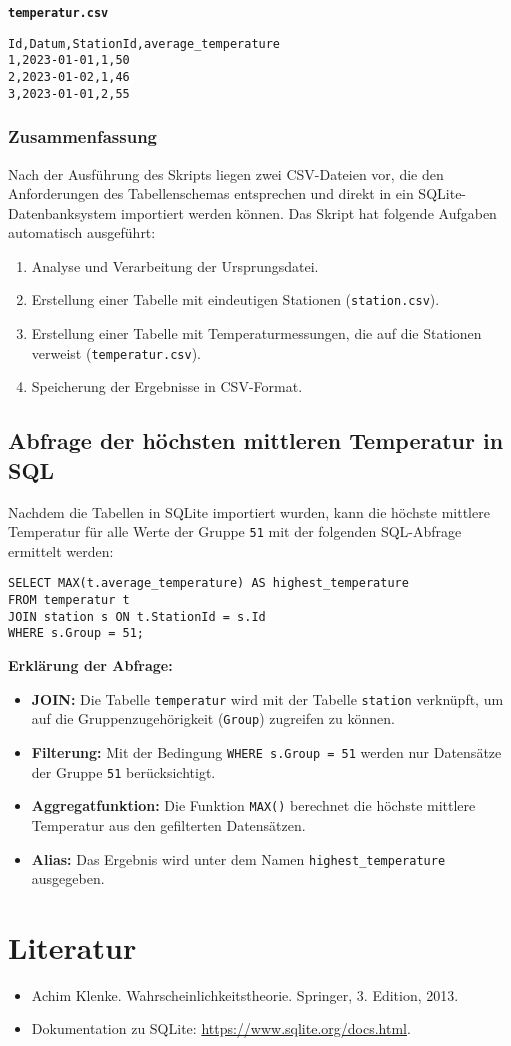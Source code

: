 \documentclass[a4paper,12pt]{article}
\begin{document}
\textbf{\texttt{temperatur.csv}}
\begin{verbatim}
Id,Datum,StationId,average_temperature
1,2023-01-01,1,50
2,2023-01-02,1,46
3,2023-01-01,2,55
\end{verbatim}

\subsubsection{Zusammenfassung}
Nach der Ausführung des Skripts liegen zwei CSV-Dateien vor, die den Anforderungen des Tabellenschemas entsprechen und direkt in ein SQLite-Datenbanksystem importiert werden können. Das Skript hat folgende Aufgaben automatisch ausgeführt:
\begin{enumerate}
    \item Analyse und Verarbeitung der Ursprungsdatei.
    \item Erstellung einer Tabelle mit eindeutigen Stationen (\texttt{station.csv}).
    \item Erstellung einer Tabelle mit Temperaturmessungen, die auf die Stationen verweist (\texttt{temperatur.csv}).
    \item Speicherung der Ergebnisse in CSV-Format.
\end{enumerate}

\subsection{Abfrage der höchsten mittleren Temperatur in SQL}
Nachdem die Tabellen in SQLite importiert wurden, kann die höchste mittlere Temperatur für alle Werte der Gruppe \texttt{51} mit der folgenden SQL-Abfrage ermittelt werden:

\begin{verbatim}
SELECT MAX(t.average_temperature) AS highest_temperature
FROM temperatur t
JOIN station s ON t.StationId = s.Id
WHERE s.Group = 51;
\end{verbatim}

\textbf{Erklärung der Abfrage:}
\begin{itemize}
    \item \textbf{JOIN:} Die Tabelle \texttt{temperatur} wird mit der Tabelle \texttt{station} verknüpft, um auf die Gruppenzugehörigkeit (\texttt{Group}) zugreifen zu können.
    \item \textbf{Filterung:} Mit der Bedingung \texttt{WHERE s.Group = 51} werden nur Datensätze der Gruppe \texttt{51} berücksichtigt.
    \item \textbf{Aggregatfunktion:} Die Funktion \texttt{MAX()} berechnet die höchste mittlere Temperatur aus den gefilterten Datensätzen.
    \item \textbf{Alias:} Das Ergebnis wird unter dem Namen \texttt{highest\_temperature} ausgegeben.
\end{itemize}

\newpage
\section*{Literatur}
\begin{itemize}
    \item Achim Klenke. Wahrscheinlichkeitstheorie. Springer, 3. Edition, 2013.
    \item Dokumentation zu SQLite: \url{https://www.sqlite.org/docs.html}.
\end{itemize}
\end{document}
